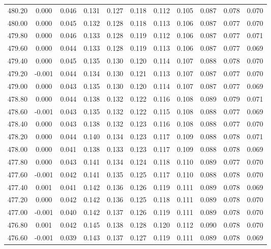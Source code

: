 \begin{longtable}{cccccccccc}
    480.20 &  0.000 &  0.046 &  0.131 &  0.127 &  0.118 &  0.112 &  0.105 &  0.087 &  0.078 &  0.070 \\
    480.00 &  0.000 &  0.045 &  0.132 &  0.128 &  0.118 &  0.113 &  0.106 &  0.087 &  0.077 &  0.070 \\
    479.80 &  0.000 &  0.046 &  0.133 &  0.128 &  0.119 &  0.112 &  0.106 &  0.087 &  0.077 &  0.071 \\
    479.60 &  0.000 &  0.044 &  0.133 &  0.128 &  0.119 &  0.113 &  0.106 &  0.087 &  0.077 &  0.069 \\
    479.40 &  0.000 &  0.045 &  0.135 &  0.130 &  0.120 &  0.114 &  0.107 &  0.088 &  0.078 &  0.070 \\
    479.20 & -0.001 &  0.044 &  0.134 &  0.130 &  0.121 &  0.113 &  0.107 &  0.087 &  0.077 &  0.070 \\
    479.00 &  0.000 &  0.043 &  0.135 &  0.130 &  0.120 &  0.114 &  0.107 &  0.087 &  0.077 &  0.069 \\
    478.80 &  0.000 &  0.044 &  0.138 &  0.132 &  0.122 &  0.116 &  0.108 &  0.089 &  0.079 &  0.071 \\
    478.60 & -0.001 &  0.043 &  0.135 &  0.132 &  0.122 &  0.115 &  0.108 &  0.088 &  0.077 &  0.069 \\
    478.40 &  0.000 &  0.043 &  0.138 &  0.132 &  0.123 &  0.116 &  0.108 &  0.088 &  0.077 &  0.070 \\
    478.20 &  0.000 &  0.044 &  0.140 &  0.134 &  0.123 &  0.117 &  0.109 &  0.088 &  0.078 &  0.071 \\
    478.00 &  0.000 &  0.041 &  0.138 &  0.133 &  0.123 &  0.117 &  0.109 &  0.088 &  0.078 &  0.069 \\
    477.80 &  0.000 &  0.043 &  0.141 &  0.134 &  0.124 &  0.118 &  0.110 &  0.089 &  0.077 &  0.070 \\
    477.60 & -0.001 &  0.042 &  0.141 &  0.135 &  0.125 &  0.117 &  0.110 &  0.088 &  0.078 &  0.070 \\
    477.40 &  0.001 &  0.041 &  0.142 &  0.136 &  0.126 &  0.119 &  0.111 &  0.089 &  0.078 &  0.069 \\
    477.20 &  0.000 &  0.042 &  0.142 &  0.136 &  0.125 &  0.118 &  0.111 &  0.089 &  0.078 &  0.070 \\
    477.00 & -0.001 &  0.040 &  0.142 &  0.137 &  0.126 &  0.119 &  0.111 &  0.089 &  0.078 &  0.070 \\
    476.80 &  0.001 &  0.042 &  0.145 &  0.138 &  0.128 &  0.120 &  0.112 &  0.090 &  0.078 &  0.070 \\
    476.60 & -0.001 &  0.039 &  0.143 &  0.137 &  0.127 &  0.119 &  0.111 &  0.089 &  0.078 &  0.069 \\

\end{longtable}
